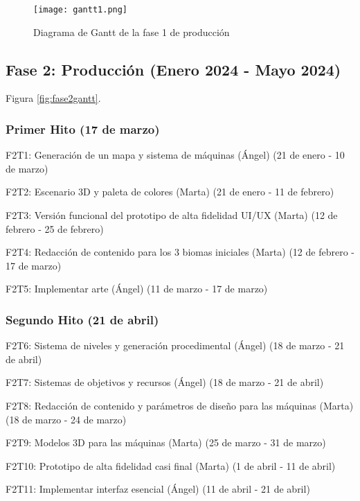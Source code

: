 \begin{figure}[H]
  \centering
	\texttt{[image: gantt1.png]}
  \caption{Diagrama de Gantt de la fase 1 de producción}
  \label{fig:fase1gantt}
\end{figure}

\subsection{Fase 2: Producción (Enero 2024 - Mayo 2024)}

Figura \ref{fig:fase2gantt}.

\subsubsection{Primer Hito (17 de marzo)}

\begin{compactitem}
\item F2T1: Generación de un mapa y sistema de máquinas (Ángel) (21 de enero - 10 de marzo)
\item F2T2: Escenario 3D y paleta de colores (Marta) (21 de enero - 11 de febrero)
\item F2T3: Versión funcional del prototipo de alta fidelidad UI/UX (Marta) (12 de febrero - 25 de febrero)
\item F2T4: Redacción de contenido para los 3 biomas iniciales (Marta) (12 de febrero - 17 de marzo)
\item F2T5: Implementar arte (Ángel) (11 de marzo - 17 de marzo)
\end{compactitem}

\subsubsection{Segundo Hito (21 de abril)}

\begin{compactitem}
\item F2T6: Sistema de niveles y generación procedimental (Ángel) (18 de marzo - 21 de abril)
\item F2T7: Sistemas de objetivos y recursos (Ángel) (18 de marzo - 21 de abril)
\item F2T8: Redacción de contenido y parámetros de diseño para las máquinas (Marta) (18 de marzo - 24 de marzo)
\item F2T9: Modelos 3D para las máquinas (Marta) (25 de marzo - 31 de marzo)
\item F2T10: Prototipo de alta fidelidad casi final (Marta) (1 de abril - 11 de abril)
\item F2T11: Implementar interfaz esencial (Ángel) (11 de abril - 21 de abril)
\end{compactitem}

